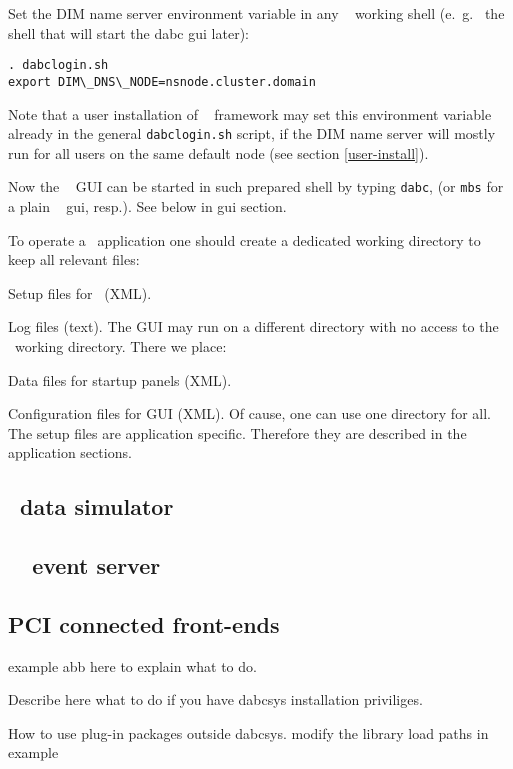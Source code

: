 \item Set the DIM name server environment variable in any \dabc~ working shell (e.~g.~
the shell that will start the dabc gui later):
\begin{verbatim}
. dabclogin.sh
export DIM\_DNS\_NODE=nsnode.cluster.domain
\end{verbatim} 
Note that a user installation of \dabc~ framework may set this 
environment variable already in the general {\tt dabclogin.sh} script, if the DIM name server will 
mostly run for all users on the same default node (see section \ref{user-install}).  

\item Now the \dabc~ GUI can be started in such prepared shell by typing {\tt dabc}, (or 
{\tt mbs} for a plain \mbs~ gui, resp.). See below in gui section.  

\enum


To operate a \dabc\ application one should create a dedicated 
working directory to keep all relevant files:
\bbul
\item Setup files for \dabc\ (XML).
\item Log files (text).
\ebul
The GUI may run on a different directory with no access to the \dabc\ working directory.
There we place:
\bbul
\item Data files for startup panels (XML).
\item Configuration files for GUI (XML).
\ebul
Of cause, one can use one directory for all.
The setup files are application specific. Therefore they are described in
the application sections.
\subsection[DABC data simulator]{\dabc\ data simulator}
\subsection[DABC MBS event server]{\dabc\ \mbs\ event server}
\subsection{PCI connected front-ends}


example abb here to explain what to do. 

Describe here what to do if you have dabcsys installation priviliges.

How to use plug-in packages outside dabcsys. modify the library load paths in example